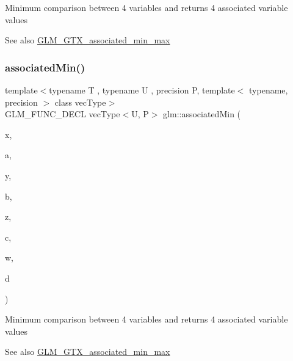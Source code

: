 Minimum comparison between 4 variables and returns 4 associated variable values \begin{DoxySeeAlso}{See also}
\hyperlink{group__gtx__associated__min__max}{G\+L\+M\+\_\+\+G\+T\+X\+\_\+associated\+\_\+min\+\_\+max} 
\end{DoxySeeAlso}
\mbox{\label{group__gtx__associated__min__max_ga88e031f22b80215505928900d3dde549}} 
\subsubsection{\texorpdfstring{associated\+Min()}{associatedMin()}\hspace{0.1cm}{\footnotesize\ttfamily [8/10]}}
{\footnotesize\ttfamily template$<$typename T , typename U , precision P, template$<$ typename, precision $>$ class vec\+Type$>$ \\
G\+L\+M\+\_\+\+F\+U\+N\+C\+\_\+\+D\+E\+CL vec\+Type$<$U, P$>$ glm\+::associated\+Min (\begin{DoxyParamCaption}\item[{vec\+Type$<$ T, P $>$ const \&}]{x,  }\item[{vec\+Type$<$ U, P $>$ const \&}]{a,  }\item[{vec\+Type$<$ T, P $>$ const \&}]{y,  }\item[{vec\+Type$<$ U, P $>$ const \&}]{b,  }\item[{vec\+Type$<$ T, P $>$ const \&}]{z,  }\item[{vec\+Type$<$ U, P $>$ const \&}]{c,  }\item[{vec\+Type$<$ T, P $>$ const \&}]{w,  }\item[{vec\+Type$<$ U, P $>$ const \&}]{d }\end{DoxyParamCaption})}

Minimum comparison between 4 variables and returns 4 associated variable values \begin{DoxySeeAlso}{See also}
\hyperlink{group__gtx__associated__min__max}{G\+L\+M\+\_\+\+G\+T\+X\+\_\+associated\+\_\+min\+\_\+max} 
\end{DoxySeeAlso}
\mbox{\label{group__gtx__associated__min__max_ga0f63b0dce5a5c3242cc6d9847e7d14f1}} 
